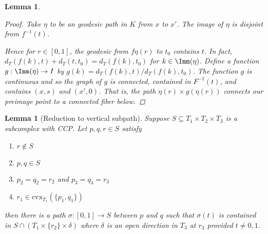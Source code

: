\documentclass[12pt,parskip=full]{report}
\theoremstyle{plain}
\newtheorem{lem}[thm]{Lemma}
\theoremstyle{definition}
\begin{document}
\begin{lem}
\begin{proof}
        Take $\eta$ to be an geodesic path in $K$ from $x$ to $x'$. The image of $\eta$ is disjoint from $f^{-1}(t)$.
        
        Hence for $r \in [0,1]$, the geodesic from $f\eta(r)$ to $t_0$ contains $t$. In fact, $d_T(f(k), t)+d_T(t, t_0) = d_T(f(k), t_0)$ for $k\in\Imm(\eta)$. Define a function $g:\Imm(\eta)\to I$ by $g(k)=d_T(f(k), t)/d_T(f(k), t_0)$. The function $g$ is continuous and so the graph of $g$ is connected, contained in $F^{-1}(t)$, and contains $(x,s)$ and $(x',0)$. That is, the path $\eta(r)\times g(\eta(r))$ connects our preimage point to a connected fiber below.
    \end{proof}
\end{lem}


\begin{lem}
    [Reduction to vertical subpath]
    \label{lem:verticalsubpath} 
    Suppose \(S \subseteq T_{1} \times T_{2} \times T_{3} \) is a subcomplex with CCP. Let \(p,q,r \in S\) satisfy
    \begin{enumerate}
        \item \(r \not\in S\) 
        \item \(p,q \in S\) 
        \item \(p_{2} = q_{2} = r_{2}\) and \(p_{3} = q_{3} =r_{3}\)
        \item \(r_1 \in \text{cvx}_{T_{1}} (\{p_1,q_1\}) \) 
    \end{enumerate}
    then there is a path \(\sigma: [0,1] \to S\) between \(p\) and \(q\) such that \(\sigma(t)\) is contained in \(S \cap (T_{1} \times \{r_{2}\} \times \delta)\) where \(\delta\) is an open direction in \(T_{3}\) at \(r_{3}\) provided \(t \neq 0,1\).


\end{lem}
\end{document}
